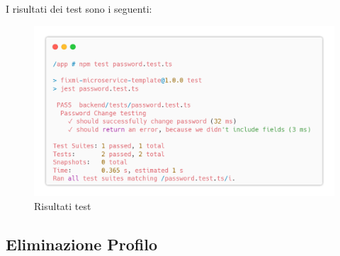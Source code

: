 \documentclass{report}
\begin{document}
I risultati dei test sono i seguenti:
\begin{figure}[H]
	\centering\includegraphics[width=1\textwidth]{images/microservizio-autenticazione/tests/password_test_results.png}
	\caption{Risultati test}
\end{figure}
\subsection{Eliminazione Profilo}
\end{document}
